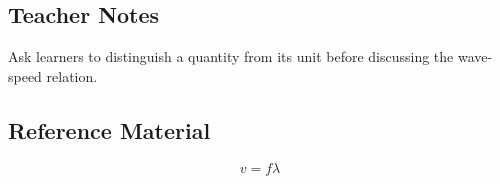 \begin{quizteachercontent}
  \section*{Teacher Notes}
  Ask learners to distinguish a quantity from its unit before discussing the
  wave-speed relation.
\end{quizteachercontent}

\begin{quizreferencecontent}
  \section*{Reference Material}
  \[v=f\lambda\]
\end{quizreferencecontent}


